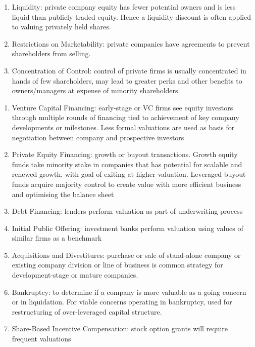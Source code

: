 \begin{remark} 
\begin{enumerate}[label=\roman*.]
\setlength{\itemsep}{0pt}
\item Liquidity: private company equity has fewer potential owners and is less liquid than publicly traded equity. Hence a liquidity discount is often applied to valuing privately held shares.
\item Restrictions on Marketability: private companies have agreements to prevent shareholders from selling.
\item Concentration of Control: control of private firms is usually concentrated in hands of few shareholders, may lead to greater perks and other benefits to owners/managers at expense of minority shareholders.
\end{enumerate}
\end{remark}

\begin{remark} 
\begin{enumerate}[label=\roman*.]
\setlength{\itemsep}{0pt}
\item Venture Capital Financing: early-stage or VC firms see equity investors through multiple rounds of financing tied to achievement of key company developments or milestones. Less formal valuations are used as basis for negotiation between company and prospective investors
\item Private Equity Financing: growth or buyout transactions. Growth equity funds take minority stake in companies that has potential for scalable and renewed growth, with goal of exiting at higher valuation. Leveraged buyout funds acquire majority control to create value with more efficient business and optimising the balance sheet
\item Debt Financing: lenders perform valuation as part of underwriting process
\item Initial Public Offering: investment banks perform valuation using values of similar firms as a benchmark
\item Acquisitions and Divestitures: purchase or sale of stand-alone company or existing company division or line of business is common strategy for development-stage or mature companies.
\item Bankruptcy: to determine if a company is more valuable as a going concern or in liquidation. For viable concerns operating in bankruptcy, used for restructuring of over-leveraged capital structure.
\item Share-Based Incentive Compensation: stock option grants will require frequent valuations
\end{enumerate}
\end{remark}

